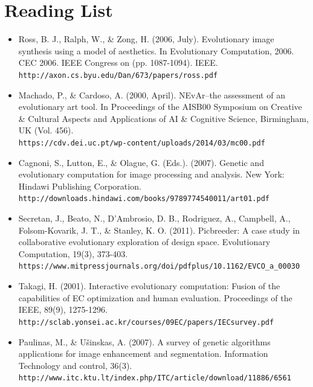 \documentclass[10pt,a4paper]{article}
\begin{document}
\section{Reading List}
\begin{itemize}
	\item Ross, B. J., Ralph, W., \& Zong, H. (2006, July). Evolutionary image synthesis using a model of aesthetics. In Evolutionary Computation, 2006. CEC 2006. IEEE Congress on (pp. 1087-1094). IEEE.
	\\
	\texttt{http://axon.cs.byu.edu/Dan/673/papers/ross.pdf}
	
	\item Machado, P., \& Cardoso, A. (2000, April). NEvAr–the assessment of an evolutionary art tool. In Proceedings of the AISB00 Symposium on Creative \& Cultural Aspects and Applications of AI \& Cognitive Science, Birmingham, UK (Vol. 456).
	\\
	\texttt{https://cdv.dei.uc.pt/wp-content/uploads/2014/03/mc00.pdf}
	
	\item Cagnoni, S., Lutton, E., \& Olague, G. (Eds.). (2007). Genetic and evolutionary computation for image processing and analysis. New York: Hindawi Publishing Corporation.
	\\
	\texttt{http://downloads.hindawi.com/books/9789774540011/art01.pdf}
	
	\item Secretan, J., Beato, N., D'Ambrosio, D. B., Rodriguez, A., Campbell, A., Folsom-Kovarik, J. T., \& Stanley, K. O. (2011). Picbreeder: A case study in collaborative evolutionary exploration of design space. Evolutionary Computation, 19(3), 373-403.
	\\
	\texttt{https://www.mitpressjournals.org/doi/pdfplus/10.1162/EVCO\_a\_00030}
	
	\item Takagi, H. (2001). Interactive evolutionary computation: Fusion of the capabilities of EC optimization and human evaluation. Proceedings of the IEEE, 89(9), 1275-1296.
	\\
	\texttt{http://sclab.yonsei.ac.kr/courses/09EC/papers/IECsurvey.pdf}
	
	\item Paulinas, M., \& Ušinskas, A. (2007). A survey of genetic algorithms applications for image enhancement and segmentation. Information Technology and control, 36(3).
	\\
	\texttt{http://www.itc.ktu.lt/index.php/ITC/article/download/11886/6561}
	

\end{itemize}
\end{document}
